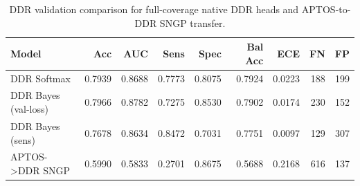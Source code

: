 \begin{table}[t]
\centering
\small
\caption{DDR validation comparison for full-coverage native DDR heads and APTOS-to-DDR SNGP transfer.}
\label{tab:ddr-models}
\begin{tabular}{lrrrrrrrr}
\toprule
Model & Acc & AUC & Sens & Spec & Bal Acc & ECE & FN & FP \\
\midrule
DDR Softmax & 0.7939 & 0.8688 & 0.7773 & 0.8075 & 0.7924 & 0.0223 & 188 & 199 \\
DDR Bayes (val-loss) & 0.7966 & 0.8782 & 0.7275 & 0.8530 & 0.7902 & 0.0174 & 230 & 152 \\
DDR Bayes (sens) & 0.7678 & 0.8634 & 0.8472 & 0.7031 & 0.7751 & 0.0097 & 129 & 307 \\
APTOS->DDR SNGP & 0.5990 & 0.5833 & 0.2701 & 0.8675 & 0.5688 & 0.2168 & 616 & 137 \\
\bottomrule
\end{tabular}
\end{table}
